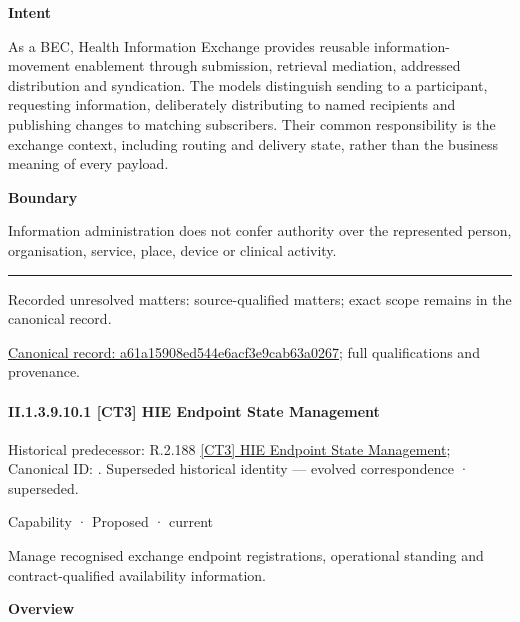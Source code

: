 \textbf{Intent}



As a BEC, Health Information Exchange provides reusable information-movement enablement through submission, retrieval mediation, addressed distribution and syndication. The models distinguish sending to a participant, requesting information, deliberately distributing to named recipients and publishing changes to matching subscribers. Their common responsibility is the exchange context, including routing and delivery state, rather than the business meaning of every payload.



\textbf{Boundary}



Information administration does not confer authority over the represented person, organisation, service, place, device or clinical activity.



\medskip\hrule\medskip

{\small Recorded unresolved matters: source-qualified matters; exact scope remains in the canonical record.}\par
{\footnotesize \href{../../../../continuum/strategy/capability/a61a15908ed544e6acf3e9cab63a0267.md}{Canonical record: a61a15908ed544e6acf3e9cab63a0267}; full qualifications and provenance.}\par
\paragraph*{II.1.3.9.10.1 [CT3] HIE Endpoint State Management}
\label{navigation:II.1.3.9.10.1}

{\small Historical predecessor: R.2.188 \hyperref[element:697de08ac49a4b7f8df7a1ed6f04210e]{[CT3] HIE Endpoint State Management}; Canonical ID: \texttt{}. Superseded historical identity — evolved correspondence · superseded.}\par
\label{element:1bec951a1c98450b8d4672c5c424f9bd}
{\small Capability · Proposed · current}\par

Manage recognised exchange endpoint registrations, operational standing and contract-qualified availability information.



\textbf{Overview}



